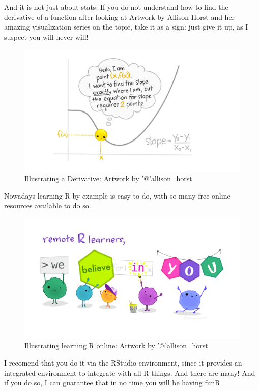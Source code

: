\documentclass[
]{book}
\begin{document}
And it is not just about stats. If you do not understand how to find the derivative of a function after looking at Artwork by Allison Horst and her amazing visualization series on the topic, take it as a sign: just give it up, as I suspect you will never will!

\begin{figure}
\centering
\includegraphics{extfiles/derivative_1.jpg}
\caption{Illustrating a Derivative: Artwork by '@'allison\_horst}
\end{figure}

Nowadays learning R by example is easy to do, with so many free online resources available to do so.

\begin{figure}
\centering
\includegraphics{extfiles/monster_support.jpg}
\caption{Illustrating learning R online: Artwork by '@'allison\_horst}
\end{figure}

I recomend that you do it via the RStudio environment, since it provides an integrated environment to integrate with all R things. And there are many! And if you do so, I can guarantee that in no time you will be having funR.
\end{document}
